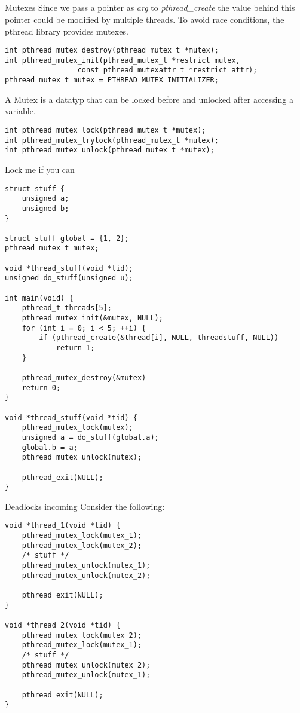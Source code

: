 \subsection{}
\begin{frame}[fragile]{Mutexes}
    Since we pass a pointer as \textit{arg} to \textit{pthread\_create} the value behind this pointer could be modified by multiple threads. To avoid race conditions, the pthread library provides mutexes.
    \begin{lstlisting}[numbers=none]
int pthread_mutex_destroy(pthread_mutex_t *mutex);
int pthread_mutex_init(pthread_mutex_t *restrict mutex,
                 const pthread_mutexattr_t *restrict attr);
pthread_mutex_t mutex = PTHREAD_MUTEX_INITIALIZER;
\end{lstlisting}
    \bigskip
    A Mutex is a datatyp that can be locked before and unlocked after accessing a variable.
    \begin{lstlisting}[numbers=none]
int pthread_mutex_lock(pthread_mutex_t *mutex);
int pthread_mutex_trylock(pthread_mutex_t *mutex);
int pthread_mutex_unlock(pthread_mutex_t *mutex);
\end{lstlisting}
\end{frame}

\begin{frame}[fragile]{Lock me if you can}
    \begin{lstlisting}[basicstyle=\tiny]
struct stuff {
    unsigned a;
    unsigned b;
}

struct stuff global = {1, 2};
pthread_mutex_t mutex;

void *thread_stuff(void *tid);
unsigned do_stuff(unsigned u);

int main(void) {
    pthread_t threads[5];
    pthread_mutex_init(&mutex, NULL);
    for (int i = 0; i < 5; ++i) {
        if (pthread_create(&thread[i], NULL, threadstuff, NULL))
            return 1;
    }
    
    pthread_mutex_destroy(&mutex)
    return 0;
}

void *thread_stuff(void *tid) {
    pthread_mutex_lock(mutex);
    unsigned a = do_stuff(global.a);
    global.b = a;
    pthread_mutex_unlock(mutex);
    
    pthread_exit(NULL);
}
\end{lstlisting}
\end{frame}

\begin{frame}[fragile]{Deadlocks incoming}
    Consider the following:
     \begin{lstlisting}[basicstyle=\scriptsize]
void *thread_1(void *tid) {
    pthread_mutex_lock(mutex_1);
    pthread_mutex_lock(mutex_2);
    /* stuff */
    pthread_mutex_unlock(mutex_1);
    pthread_mutex_unlock(mutex_2);
    
    pthread_exit(NULL);
}

void *thread_2(void *tid) {
    pthread_mutex_lock(mutex_2);
    pthread_mutex_lock(mutex_1);
    /* stuff */
    pthread_mutex_unlock(mutex_2);
    pthread_mutex_unlock(mutex_1);
    
    pthread_exit(NULL);
}
\end{lstlisting}
\end{frame}


